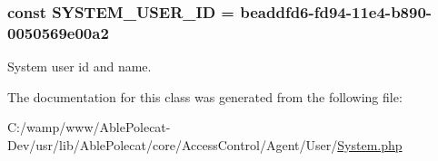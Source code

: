\subsubsection[{S\+Y\+S\+T\+E\+M\+\_\+\+U\+S\+E\+R\+\_\+\+I\+D}]{\setlength{\rightskip}{0pt plus 5cm}const S\+Y\+S\+T\+E\+M\+\_\+\+U\+S\+E\+R\+\_\+\+I\+D = \textquotesingle{}beaddfd6-\/fd94-\/11e4-\/b890-\/0050569e00a2\textquotesingle{}}\label{class_able_polecat___access_control___agent___user___system_aad521128c3cc2c96d3aaa271b70fb173}
System user id and name. 

The documentation for this class was generated from the following file\+:\begin{DoxyCompactItemize}
\item 
C\+:/wamp/www/\+Able\+Polecat-\/\+Dev/usr/lib/\+Able\+Polecat/core/\+Access\+Control/\+Agent/\+User/\hyperlink{_system_8php}{System.\+php}\end{DoxyCompactItemize}
